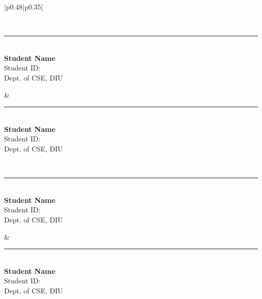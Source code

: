 \begin{table}[h!]
\centering
\renewcommand{\arraystretch}{3} %
\setlength{\tabcolsep}{10pt} %

\begin{tabular}{|p{0.48\textwidth}|p{0.35\textwidth}|} %

\hline
{} \\
\hline

\begin{minipage}{\linewidth}
    \centering
    \vspace{1.5cm} %
    \rule{6cm}{0.4pt} %
    \\
    \textbf{Student Name} \\ Student ID: \\ Dept. of CSE, DIU
\end{minipage} &

\begin{minipage}{\linewidth}
    \centering
    \vspace{1.5cm} %
    \rule{6cm}{0.4pt} %
    \\
    \textbf{Student Name} \\ Student ID: \\ Dept. of CSE, DIU
\end{minipage} \\
\hline

\begin{minipage}{\linewidth}
    \centering
    \vspace{1.5cm} %
    \rule{6cm}{0.4pt} %
    \\
    \textbf{Student Name} \\ Student ID: \\ Dept. of CSE, DIU
\end{minipage} &

\begin{minipage}{\linewidth}
    \centering
    \vspace{1.5cm} %
    \rule{6cm}{0.4pt} %
    \\
    \textbf{Student Name} \\ Student ID: \\ Dept. of CSE, DIU
\end{minipage} \\
\hline

\end{tabular}

\end{table}
